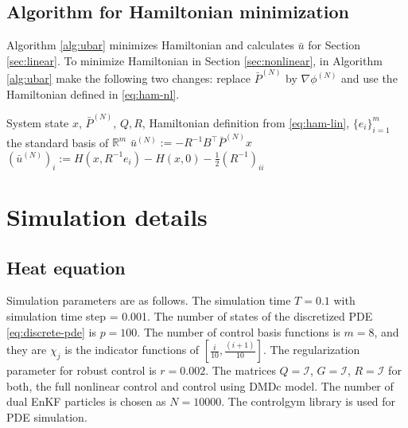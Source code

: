 \documentclass[letterpaper, 10 pt, conference]{ieeeconf}  %
\newcommand{\tp}{^\top}
\newcommand{\inv}{^{-1}}
\newcommand{\R}{\mathbb{R}}
\newcommand{\half}{\frac{1}{2}}
\newcommand{\grad}{\nabla}
\newcommand{\id}{\mathcal{I}}
\begin{document}
\subsection{Algorithm for Hamiltonian minimization }
\label{app:ubar}
Algorithm \ref{alg:ubar} minimizes Hamiltonian and calculates $\bar{u}$ for Section \ref{sec:linear}. To minimize Hamiltonian in Section \ref{sec:nonlinear}, in Algorithm \ref{alg:ubar} make the following two changes: replace $\bar{P}^{(N)}$  by $\grad\phi^{(N)}$ and use the Hamiltonian defined in \eqref{eq:ham-nl}.
\begin{algorithm}
\begin{algorithmic}[1]
\Input System state $x$, $\bar{P}^{(N)}$, $Q,R$, Hamiltonian definition from \eqref{eq:ham-lin}, $\{e_i\}_{i=1}^{m}$ the standard basis of $\R^m$
\State \Return $\bar{u}^{(N)} := -R\inv B\tp \bar{P}^{(N)}x$
    \State $(\bar{u}^{(N)})_i := H(x,R\inv e_i) - H(x,0) - \half (R\inv)_{ii}$
    \EndFor
\EndIf
\end{algorithmic}
\caption{Algorithm for Hamiltonian minimization}
\label{alg:ubar}
\end{algorithm}

\section{Simulation details}
\subsection{Heat equation}
\label{app:heat}
Simulation parameters are as follows. The simulation time $T = 0.1$ %
with simulation time step = 0.001. 
The number of states of the discretized PDE \eqref{eq:discrete-pde} is $p=100$. 
The number of control basis functions is $m=8$, and they are $\chi_j$ is the indicator functions of $[\frac{i}{10},\frac{(i+1)}{10}]$. The regularization parameter for robust control is $r = 0.002$.
The matrices  $Q = \id$, $G=\id$, $R=\id$ for both, the full nonlinear control and control using DMDc model.
The number of dual EnKF particles is chosen as $N=10000$. The controlgym library \cite{zhang2023controlgym} is used for PDE simulation. 
\end{document}
